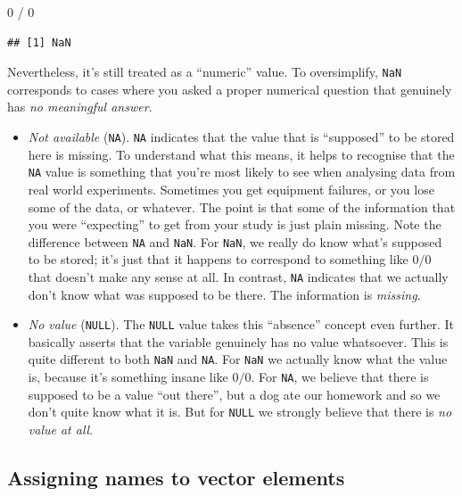 \documentclass[
]{book}
\newenvironment{Shaded}{\begin{snugshade}}{\end{snugshade}}
\newcommand{\DecValTok}[1]{\textcolor[rgb]{0.00,0.00,0.81}{#1}}
\newcommand{\SpecialCharTok}[1]{\textcolor[rgb]{0.00,0.00,0.00}{#1}}
\begin{document}
\begin{Shaded}
\begin{Highlighting}[]
 \DecValTok{0} \SpecialCharTok{/} \DecValTok{0}
\end{Highlighting}
\end{Shaded}

\begin{verbatim}
## [1] NaN
\end{verbatim}

Nevertheless, it's still treated as a ``numeric'' value. To oversimplify, \texttt{NaN} corresponds to cases where you asked a proper numerical question that genuinely has \emph{no meaningful answer}.

\begin{itemize}
\item
  \emph{Not available} (\texttt{NA}).
  \texttt{NA} indicates that the value that is ``supposed'' to be stored here is missing. To understand what this means, it helps to recognise that the \texttt{NA} value is something that you're most likely to see when analysing data from real world experiments. Sometimes you get equipment failures, or you lose some of the data, or whatever. The point is that some of the information that you were ``expecting'' to get from your study is just plain missing. Note the difference between \texttt{NA} and \texttt{NaN}. For \texttt{NaN}, we really do know what's supposed to be stored; it's just that it happens to correspond to something like \(0/0\) that doesn't make any sense at all. In contrast, \texttt{NA} indicates that we actually don't know what was supposed to be there. The information is \emph{missing}.
\item
  \emph{No value} (\texttt{NULL}).
  The \texttt{NULL} value takes this ``absence'' concept even further. It basically asserts that the variable genuinely has no value whatsoever. This is quite different to both \texttt{NaN} and \texttt{NA}. For \texttt{NaN} we actually know what the value is, because it's something insane like \(0/0\). For \texttt{NA}, we believe that there is supposed to be a value ``out there'', but a dog ate our homework and so we don't quite know what it is. But for \texttt{NULL} we strongly believe that there is \emph{no value at all}.
\end{itemize}

\hypertarget{names}{%
\subsection{Assigning names to vector elements}\label{names}}
\end{document}
